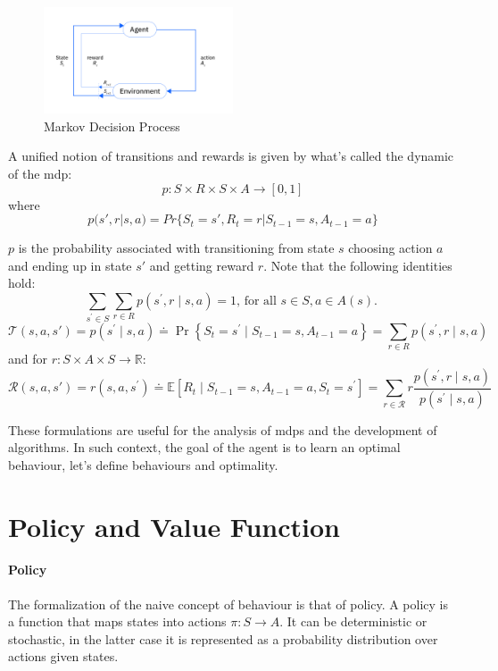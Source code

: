 \begin{figure}[H]
    \centering
    \includegraphics[width=0.5\textwidth]{images/MDP.png}
    \caption{Markov Decision Process}
    \label{fig:mdp}
\end{figure}

A unified notion of transitions and rewards is given by what's called the dynamic of the \gls{mdp}:
$$p : S \times R \times S \times A \rightarrow [0, 1]$$
where
$$p(s' , r |s, a) = Pr\{S_t = s' , R_t = r | S_{t-1} = s, A_{t-1}= a\}$$

$p$ is the probability associated with transitioning from state $s$ choosing action $a$ 
and ending up in state $s'$ and getting reward $r$. Note that the following identities hold:
$$\sum_{s^{\prime} \in S} \sum_{r \in R} p\left(s^{\prime}, r \mid s, a\right)=1 \text {, for all } s \in S, a \in A(s) \text {. }  $$
$$
\mathcal{T}(s,a,s') = p\left(s^{\prime} \mid s, a\right) \doteq \operatorname{Pr}\left\{S_{t}=s^{\prime} \mid S_{t-1}=s, A_{t-1}=a\right\}=\sum_{r \in R} p\left(s^{\prime}, r \mid s, a\right)
$$
and for \(r: S \times A \times S \rightarrow \mathbb{R}\):
$$
\mathcal{R}(s,a,s') = r\left(s, a, s^{\prime}\right) \doteq \mathbb{E}\left[R_{t} \mid S_{t-1}=s, A_{t-1}=a, S_{t}=s^{\prime}\right]=\sum_{r \in \mathcal{R}} r \frac{p\left(s^{\prime}, r \mid s, a\right)}{p\left(s^{\prime} \mid s, a\right)}
$$

These formulations are useful for the analysis of \glspl{mdp} and the development of algorithms. 
In such context, the goal of the agent is to learn an optimal behaviour, let's define behaviours and optimality.

\section{Policy and Value Function}
\paragraph{Policy}
The formalization of the naive concept of behaviour is that of policy. A policy is a function that 
maps states into actions $\pi : S \rightarrow A$. It can be deterministic or stochastic, in 
the latter case it is represented as a probability distribution over actions given states.

